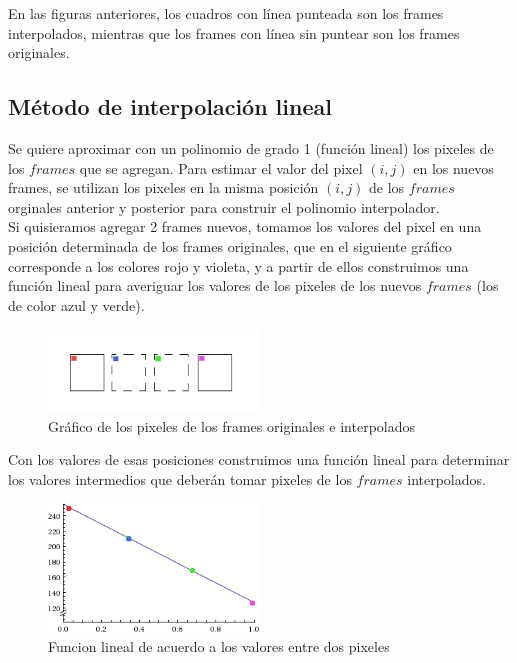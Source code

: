 En las figuras anteriores, los cuadros con línea punteada son los frames interpolados, mientras que los frames con línea sin puntear son los frames originales.

\subsection{Método de interpolación lineal}
Se quiere aproximar con un polinomio de grado 1 (función lineal) los pixeles de los $frames$ que se agregan. Para estimar el valor del pixel $(i,j)$ en los nuevos frames, se utilizan los pixeles en la
misma posición $(i,j)$ de los $frames$ orginales anterior y posterior para construir el polinomio interpolador. \\

Si quisieramos agregar 2 frames nuevos, tomamos los valores del pixel en una posición determinada de los frames originales, que en el siguiente gráfico corresponde a los colores rojo y violeta, y a partir de ellos construimos una función lineal para averiguar los valores de los pixeles de los nuevos $frames$ (los de color azul y verde).


\begin{figure}[h!]
  \centering
    \includegraphics[width=0.5\textwidth]{imagenes/linealFrames.png}
  \caption{Gráfico de los pixeles de los frames originales e interpolados}
\end{figure}

Con los valores de esas posiciones construimos una función lineal para determinar los valores intermedios que deberán tomar pixeles de los $frames$ interpolados.

\begin{figure}[h!]
  \centering
    \includegraphics[width=0.5\textwidth]{imagenes/lineal2.png}
  \caption{Funcion lineal de acuerdo a los valores entre dos pixeles}
\end{figure}


